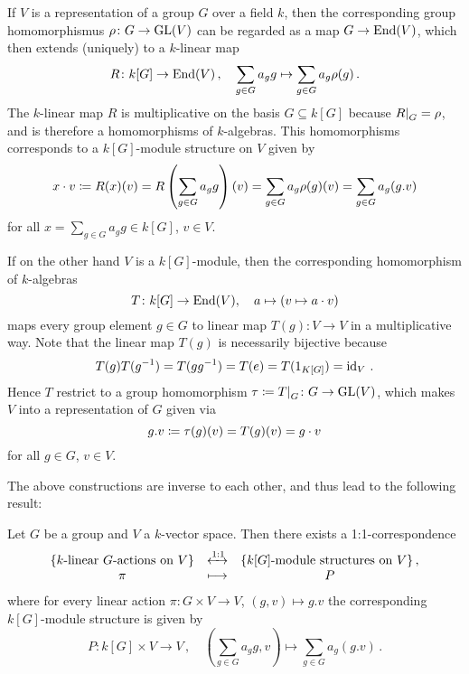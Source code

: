 \begin{fluff}
  \label{fluff: correspondence between representations and module structures}
  If $V$ is a representation of a group $G$ over a field $k$, then the corresponding group homomorphismus $\rho \colon G \to \operatorname{GL}(V)$ can be regarded as a map $G \to \operatorname{End}(V)$, which then extends (uniquely) to a $k$-linear map
  \[
            R
    \colon  k[G]
    \to     \operatorname{End}(V) \,,
    \quad   \sum_{g \in G} a_g g
    \mapsto \sum_{g \in G} a_g \rho(g) \,.
  \]
  The $k$-linear map $R$ is multiplicative on the basis $G \subseteq k[G]$ because $\restrict{R}{G} = \rho$, and is therefore a homomorphisms of $k$-algebras.
  This homomorphisms corresponds to a $k[G]$-module structure on $V$ given by
  \[
              x \cdot v
    \coloneqq  R(x)(v)
    =         R\left( \sum_{g \in G} a_g g \right)(v)
    =         \sum_{g \in G} a_g \rho(g)(v)
    =         \sum_{g \in G} a_g (g.v)
  \]
  for all $x = \sum_{g \in G} a_g g \in k[G]$, $v \in V$.
  
  If on the other hand $V$ is a $k[G]$-module, then the corresponding homomorphism of $k$-algebras
  \[
            T
    \colon  k[G]
    \to     \operatorname{End}(V),
    \quad   a
    \mapsto (v \mapsto a \cdot v)
  \]
  maps every group element $g \in G$ to linear map $T(g) \colon V \to V$ in a multiplicative way.
  Note that the linear map $T(g)$ is necessarily bijective because
  \[
      T(g) T(g^{-1})
    = T(g g^{-1})
    = T(e)
    = T(1_{K[G]})
    = \operatorname{id}_V \,.
  \]
  Hence $T$ restrict to a group homomorphism $\tau \defined \restrict{T}{G} \colon G \to \GL(V)$, which makes $V$ into a representation of $G$ given via
  \[
              g.v
    \coloneqq  \tau(g)(v)
    =         T(g)(v)
    =         g \cdot v
  \]
  for all $g \in G$, $v \in V$.
  
  The above constructions are inverse to each other, and thus lead to the following result:
\end{fluff}


\begin{corollary}
  \label{corollary: correspondence between representations and module structures}
  Let $G$ be a group and $V$ a $k$-vector space.
  Then there exists a 1:1-correspondence
  \[
  \begin{matrix}
      \{ \text{$k$-linear $G$-actions on $V$} \}
    & \xleftrightarrow{1:1}
    & \{ \text{$k[G]$-module structures on $V$} \} \,, \\
      \pi
    & \longmapsto
    & P
    \end{matrix}
  \]
  where for every linear action $\pi \colon G \times V \to V$, $(g,v) \mapsto g.v$ the corresponding $k[G]$-module structure is given by
  \[
            P
    \colon  k[G] \times V
    \to     V \,,
    \quad   \left( \sum_{g \in G} a_g g, v \right)
    \mapsto \sum_{g \in G} a_g (g.v) \,.
  \]
\end{corollary}


